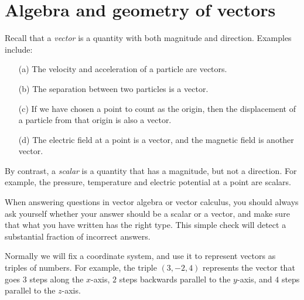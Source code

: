 \documentclass[reqno]{amsart}
\theoremstyle{definition}
\begin{document}
\section{Algebra and geometry of vectors}
\label{sec-vectors}

Recall that a \emph{vector} is a quantity with both magnitude and
direction.  Examples include:
\begin{itemize}
 \item[(a)] The velocity and acceleration of a particle are vectors.
 \item[(b)] The separation between two particles is a vector.
 \item[(c)] If we have chosen a point to count as the origin, then the
  displacement of a particle from that origin is also a vector.
 \item[(d)] The electric field at a point is a vector, and the
  magnetic field is another vector.
\end{itemize}

By contrast, a \emph{scalar} is a quantity that has a magnitude, but
not a direction.  For example, the pressure, temperature and electric
potential at a point are scalars.

When answering questions in vector algebra or vector calculus, you
should always ask yourself whether your answer should be a scalar or a
vector, and make sure that what you have written has the right type.
This simple check will detect a substantial fraction of incorrect
answers. 

Normally we will fix a coordinate system, and use it to represent
vectors as triples of numbers.  For example, the triple $(3,-2,4)$
represents the vector that goes $3$ steps along the $x$-axis, $2$
steps backwards parallel to the $y$-axis, and $4$ steps parallel to
the $z$-axis.
\begin{center}
\end{center}
\end{document}
